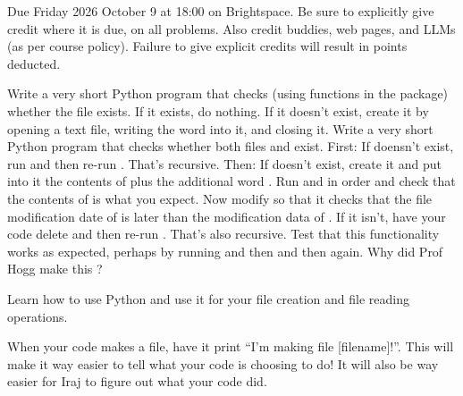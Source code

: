\documentclass[12pt]{article}
\begin{document}
Due Friday 2026 October 9 at 18:00 on Brightspace.
Be sure to explicitly give credit where it is due, on all problems.
Also credit buddies, web pages, and LLMs (as per course policy).
Failure to give explicit credits will result in points deducted.

\begin{problem}
  \subpart
  Write a very short Python program  that checks (using functions in the  package) whether the file  exists.
  If it exists, do nothing.
  If it doesn't exist, create it by opening a text file, writing the word  into it, and closing it.
  \subpart
  Write a very short Python program  that checks whether both files  and  exist.
  First: If  doensn't exist, run  and then re-run .
  That's recursive.
  Then: If  doesn't exist, create it and put into it the contents of  plus the additional word .
  \subpart
  Run  and  in order and check that the contents of  is what you expect.
  \subpart
  Now modify  so that it checks that the file modification date of  is later than the modification data of .
  If it isn't, have your code delete  and then re-run .
  That's also recursive.
  Test that this functionality works as expected, perhaps by running  and then  and then  again.
  \subpart
  Why did Prof Hogg make this \problemname?
\end{problem}

\begin{note}
  Learn how to use Python  and use it for your file creation and file reading operations.
\end{note}

\begin{note}
  When your code makes a file, have it print ``I'm making file [filename]!''.
  This will make it way easier to tell what your code is choosing to do!
  It will also be way easier for Iraj to figure out what your code did.
\end{note}
\end{document}
